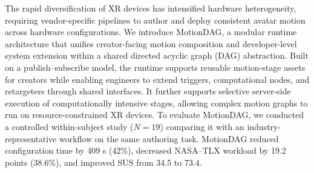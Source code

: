 The rapid diversification of XR devices has intensified hardware heterogeneity, requiring vendor-specific pipelines to author and deploy consistent avatar motion across hardware configurations.
We introduce MotionDAG, a modular runtime architecture that unifies creator-facing motion composition and developer-level system extension within a shared directed acyclic graph (DAG) abstraction. 
Built on a publish–subscribe model, the runtime supports reusable motion-stage assets for creators while enabling engineers to extend triggers, computational nodes, and retargeters through shared interfaces.
It further supports selective server-side execution of computationally intensive stages, allowing complex motion graphs to run on resource-constrained XR devices.
To evaluate MotionDAG, we conducted a controlled within-subject study ($N = 19$) comparing it with an industry-representative workflow on the same authoring task.
MotionDAG reduced configuration time by 409 s (42\%), decreased NASA–TLX workload by 19.2 points (38.6\%), and improved SUS from 34.5 to 73.4.
